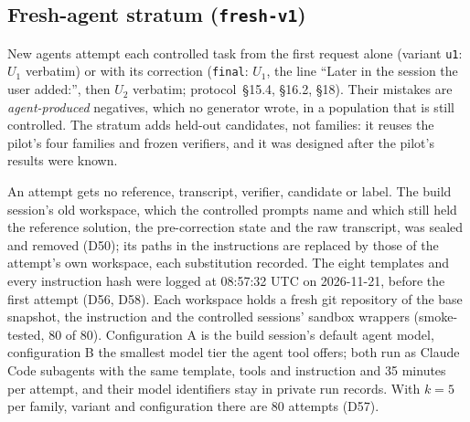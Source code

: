 \subsection{Fresh-agent stratum (\texttt{fresh-v1})}
\label{sec:fresh}
New agents attempt each controlled task from the first request alone (variant \texttt{u1}: $U_1$ verbatim) or with its correction (\texttt{final}: $U_1$, the line ``Later in the session the user added:'', then $U_2$ verbatim; protocol~\S15.4, \S16.2, \S18). Their mistakes are \emph{agent-produced} negatives, which no generator wrote, in a population that is still controlled. The stratum adds held-out candidates, not families: it reuses the pilot's four families and frozen verifiers, and it was designed after the pilot's results were known.

An attempt gets no reference, transcript, verifier, candidate or label. The build session's old workspace, which the controlled prompts name and which still held the reference solution, the pre-correction state and the raw transcript, was sealed and removed (D50); its paths in the instructions are replaced by those of the attempt's own workspace, each substitution recorded. The eight templates and every instruction hash were logged at 08:57:32 UTC on 2026-11-21, before the first attempt (D56, D58). Each workspace holds a fresh git repository of the base snapshot, the instruction and the controlled sessions' sandbox wrappers (smoke-tested, 80 of 80). Configuration A is the build session's default agent model, configuration B the smallest model tier the agent tool offers; both run as Claude Code subagents with the same template, tools and instruction and 35 minutes per attempt, and their model identifiers stay in private run records. With $k=5$ per family, variant and configuration there are 80 attempts (D57).

